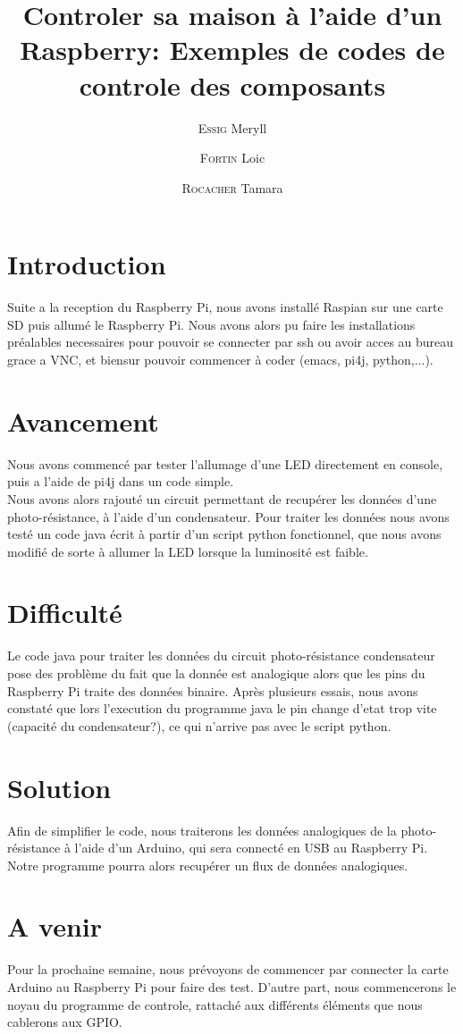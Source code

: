 \documentclass{article}
\title{Controler sa maison à l'aide d'un Raspberry: Exemples de codes de controle des composants}
\author{\textsc{Essig} Meryll \and \textsc{Fortin} Loic \and \textsc{Rocacher} Tamara}
\begin{document}
\maketitle
\section*{Introduction}
Suite a la reception du Raspberry Pi, nous avons installé Raspian sur une carte SD puis allumé le Raspberry Pi. Nous avons alors pu faire les installations préalables necessaires pour pouvoir se connecter par ssh ou avoir acces au bureau grace a VNC, et biensur pouvoir commencer à coder (emacs, pi4j, python,...).
\section*{Avancement}
Nous avons commencé par tester l'allumage d'une LED directement en console, puis a l'aide de pi4j dans un code simple. \\
Nous avons alors rajouté un circuit permettant de recupérer les données d'une photo-résistance, à l'aide d'un condensateur. Pour traiter les données nous avons testé un code java écrit à partir d'un script python fonctionnel, que nous avons modifié de sorte à allumer la LED lorsque la luminosité est faible.
\section*{Difficulté}
Le code java pour traiter les données du circuit photo-résistance condensateur pose des problème du fait que la donnée est analogique alors que les pins du Raspberry Pi traite des données binaire.
Après plusieurs essais, nous avons constaté que lors l'execution du programme java le pin change d'etat trop vite (capacité du condensateur?), ce qui n'arrive pas avec le script python.
\section*{Solution}
Afin de simplifier le code, nous traiterons les données analogiques de la photo-résistance à l'aide d'un Arduino, qui sera connecté en USB au Raspberry Pi. Notre programme pourra alors recupérer un flux de données analogiques.
\section*{A venir}
Pour la prochaine semaine, nous prévoyons de commencer par connecter la carte Arduino au Raspberry Pi pour faire des test. D'autre part, nous commencerons le noyau du programme de controle, rattaché aux différents éléments que nous cablerons aux GPIO.
\end{document}
